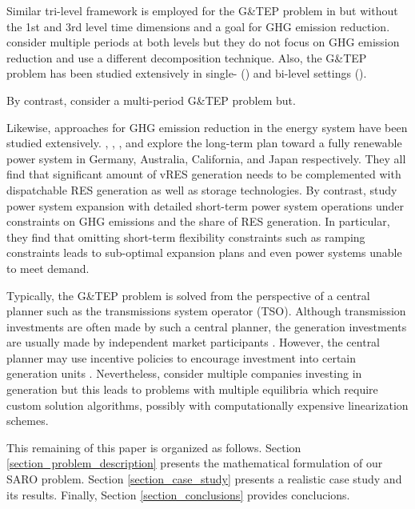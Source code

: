 \documentclass[final]{IEEEtran}
\begin{document}

Similar tri-level framework is employed for the G\&TEP problem in \cite{Minquez, Moreira, Baringo2018} but without the 1st and 3rd level time dimensions and a goal for GHG emission reduction. \cite{Li, Roldan} consider multiple periods at both levels but they do not focus on GHG emission reduction and use a different decomposition technique. Also, the G\&TEP problem has been studied extensively in single- (\cite{Lopez, Dominguez, Munoz}) and bi-level settings (\cite{Zhang, Pisciella, Maurovich}).

By contrast, \cite{Barati} consider a multi-period G&TEP problem but.

Likewise, approaches for GHG emission reduction in the energy system have been studied extensively. \cite{Hansen}, \cite{Blakers}, \cite{Colbertaldo}, and \cite{Esteban} explore the long-term plan toward a fully renewable power system in Germany, Australia, California, and Japan respectively. They all find that significant amount of vRES generation needs to be complemented with dispatchable RES generation as well as storage technologies. By contrast, \cite{Chen, Palmintier} study power system expansion with detailed short-term power system operations under constraints on GHG emissions and the share of RES generation. In particular, they find that omitting short-term flexibility constraints such as ramping constraints leads to sub-optimal expansion plans and even power systems unable to meet demand.

Typically, the G&TEP problem is solved from the perspective of a central planner such as the transmissions system operator (TSO). Although transmission investments are often made by such a central planner, the generation investments are usually made by independent market participants \cite{Baringo2018}. However, the central planner may use incentive policies to encourage investment into certain generation units \cite{Zhou, Das}. Nevertheless, \cite{Jin, Roh, Pozo} consider multiple companies investing in generation but this leads to problems with multiple equilibria which require custom solution algorithms, possibly with computationally expensive linearization schemes.





This remaining of this paper is organized as follows. Section \ref{section_problem_description} presents the mathematical formulation of our SARO problem. Section \ref{section_case_study} presents a realistic case study and its results. Finally, Section \ref{section_conclusions} provides conclucions.
\end{document}
